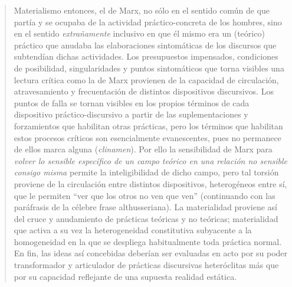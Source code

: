 \begin{quote}
Materialismo entonces, el de Marx, no sólo en el sentido común de que partía y se ocupaba de la actividad práctico-concreta de los hombres, sino en el sentido \emph{extrañamente} inclusivo en que él mismo era un (teórico) práctico que anudaba las elaboraciones sintomáticas de los discursos que subtendían dichas actividades. Los presupuestos impensados, condiciones de posibilidad, singularidades y puntos sintomáticos que torna visibles una lectura crítica como la de Marx provienen de la capacidad de circulación, atravesamiento y frecuentación de distintos dispositivos discursivos. Los puntos de falla se tornan visibles en los propios términos de cada dispositivo práctico-discursivo a partir de las suplementaciones y forzamientos que habilitan otras prácticas, pero los términos que habilitan estos procesos críticos son esencialmente evanescentes, pues no permanece de ellos marca alguna (\emph{clinamen}). Por ello la sensibilidad de Marx para \emph{volver lo sensible específico de un campo teórico  en una relación no sensible consigo misma} permite la inteligibilidad de dicho campo, pero tal torsión proviene de la circulación entre distintos dispositivos, heterogéneos entre sí, que le permiten \enquote{ver que los otros no ven que ven} (continuando con las paráfrasis de la célebre frase althusseriana). La materialidad proviene así del cruce y anudamiento de prácticas teóricas y no teóricas; materialidad que activa a su vez la heterogeneidad constitutiva subyacente a la homogeneidad en la que se despliega habitualmente toda práctica normal. En fin, las ideas así concebidas deberían ser evaluadas en acto por su poder transformador y articulador de prácticas discursivas heteróclitas más que por su capacidad reflejante de una supuesta realidad estática.


\end{quote}
